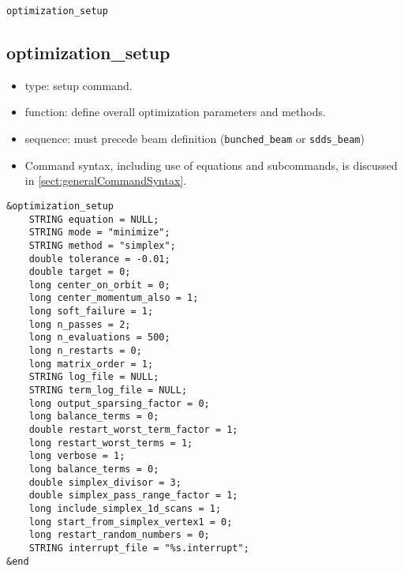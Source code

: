 \documentclass[11pt]{article}
\begin{document}
\newpage
\begin{center}{\Large\verb|optimization_setup|}\end{center}
\subsection{optimization\_setup \label{subsec:optimizationsetup}}

\begin{itemize}
\item type: setup command.
\item function: define overall optimization parameters and methods.
\item sequence: must precede beam definition (\verb|bunched_beam| or \verb|sdds_beam|)
\item Command syntax, including use of equations and subcommands, is discussed in \ref{sect:generalCommandSyntax}.
\end{itemize}

\begin{verbatim}
&optimization_setup
    STRING equation = NULL;
    STRING mode = "minimize";
    STRING method = "simplex";
    double tolerance = -0.01;
    double target = 0;
    long center_on_orbit = 0;
    long center_momentum_also = 1;
    long soft_failure = 1;
    long n_passes = 2;
    long n_evaluations = 500; 
    long n_restarts = 0;
    long matrix_order = 1;
    STRING log_file = NULL;
    STRING term_log_file = NULL;
    long output_sparsing_factor = 0;
    long balance_terms = 0;
    double restart_worst_term_factor = 1;
    long restart_worst_terms = 1;
    long verbose = 1;
    long balance_terms = 0;
    double simplex_divisor = 3;
    double simplex_pass_range_factor = 1;
    long include_simplex_1d_scans = 1;
    long start_from_simplex_vertex1 = 0;
    long restart_random_numbers = 0;
    STRING interrupt_file = "%s.interrupt";
&end
\end{verbatim}
\end{document}
